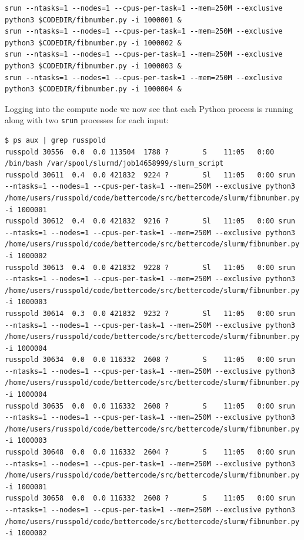 \begin{lstlisting}[style=shell]
srun --ntasks=1 --nodes=1 --cpus-per-task=1 --mem=250M --exclusive python3 $CODEDIR/fibnumber.py -i 1000001 &
srun --ntasks=1 --nodes=1 --cpus-per-task=1 --mem=250M --exclusive python3 $CODEDIR/fibnumber.py -i 1000002 &
srun --ntasks=1 --nodes=1 --cpus-per-task=1 --mem=250M --exclusive python3 $CODEDIR/fibnumber.py -i 1000003 &
srun --ntasks=1 --nodes=1 --cpus-per-task=1 --mem=250M --exclusive python3 $CODEDIR/fibnumber.py -i 1000004 &
\end{lstlisting}

Logging into the compute node we now see that each Python process is running along with two \texttt{srun} processes for each input:

\begin{lstlisting}[style=shell]
$ ps aux | grep russpold
russpold 30556  0.0  0.0 113504  1788 ?        S    11:05   0:00 /bin/bash /var/spool/slurmd/job14658999/slurm_script
russpold 30611  0.4  0.0 421832  9224 ?        Sl   11:05   0:00 srun --ntasks=1 --nodes=1 --cpus-per-task=1 --mem=250M --exclusive python3 /home/users/russpold/code/bettercode/src/bettercode/slurm/fibnumber.py -i 1000001
russpold 30612  0.4  0.0 421832  9216 ?        Sl   11:05   0:00 srun --ntasks=1 --nodes=1 --cpus-per-task=1 --mem=250M --exclusive python3 /home/users/russpold/code/bettercode/src/bettercode/slurm/fibnumber.py -i 1000002
russpold 30613  0.4  0.0 421832  9228 ?        Sl   11:05   0:00 srun --ntasks=1 --nodes=1 --cpus-per-task=1 --mem=250M --exclusive python3 /home/users/russpold/code/bettercode/src/bettercode/slurm/fibnumber.py -i 1000003
russpold 30614  0.3  0.0 421832  9232 ?        Sl   11:05   0:00 srun --ntasks=1 --nodes=1 --cpus-per-task=1 --mem=250M --exclusive python3 /home/users/russpold/code/bettercode/src/bettercode/slurm/fibnumber.py -i 1000004
russpold 30634  0.0  0.0 116332  2608 ?        S    11:05   0:00 srun --ntasks=1 --nodes=1 --cpus-per-task=1 --mem=250M --exclusive python3 /home/users/russpold/code/bettercode/src/bettercode/slurm/fibnumber.py -i 1000004
russpold 30635  0.0  0.0 116332  2608 ?        S    11:05   0:00 srun --ntasks=1 --nodes=1 --cpus-per-task=1 --mem=250M --exclusive python3 /home/users/russpold/code/bettercode/src/bettercode/slurm/fibnumber.py -i 1000003
russpold 30648  0.0  0.0 116332  2604 ?        S    11:05   0:00 srun --ntasks=1 --nodes=1 --cpus-per-task=1 --mem=250M --exclusive python3 /home/users/russpold/code/bettercode/src/bettercode/slurm/fibnumber.py -i 1000001
russpold 30658  0.0  0.0 116332  2608 ?        S    11:05   0:00 srun --ntasks=1 --nodes=1 --cpus-per-task=1 --mem=250M --exclusive python3 /home/users/russpold/code/bettercode/src/bettercode/slurm/fibnumber.py -i 1000002

\end{lstlisting}
